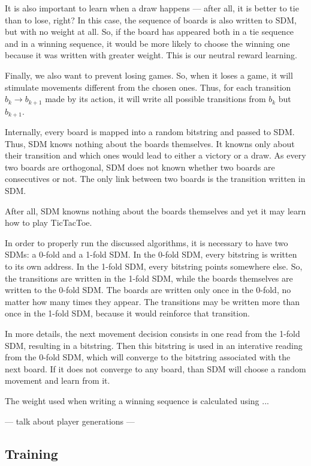 It is also important to learn when a draw happens --- after all, it is better to tie than to lose, right? In this case, the sequence of boards is also written to SDM, but with no weight at all. So, if the board has appeared both in a tie sequence and in a winning sequence, it would be more likely to choose the winning one because it was written with greater weight. This is our neutral reward learning.

Finally, we also want to prevent losing games. So, when it loses a game, it will stimulate movements different from the chosen ones. Thus, for each transition $b_k \rightarrow b_{k+1}$ made by its action, it will write all possible transitions from $b_k$ but $b_{k+1}$.

Internally, every board is mapped into a random bitstring and passed to SDM. Thus, SDM knows nothing about the boards themselves. It knowns only about their transition and which ones would lead to either a victory or a draw. As every two boards are orthogonal, SDM does not known whether two boards are consecutives or not. The only link between two boards is the transition written in SDM.

After all, SDM knowns nothing about the boards themselves and yet it may learn how to play TicTacToe.

In order to properly run the discussed algorithms, it is necessary to have two SDMs: a 0-fold and a 1-fold SDM. In the 0-fold SDM, every bitstring is written to its own address. In the 1-fold SDM, every bitstring points somewhere else. So, the transitions are written in the 1-fold SDM, while the boards themselves are written to the 0-fold SDM. The boards are written only once in the 0-fold, no matter how many times they appear. The transitions may be written more than once in the 1-fold SDM, because it would reinforce that transition.

In more details, the next movement decision consists in one read from the 1-fold SDM, resulting in a bitstring. Then this bitstring is used in an interative reading from the 0-fold SDM, which will converge to the bitstring associated with the next board. If it does not converge to any board, than SDM will choose a random movement and learn from it.

The weight used when writing a winning sequence is calculated using ...

--- talk about player generations ---

\subsection{Training}

